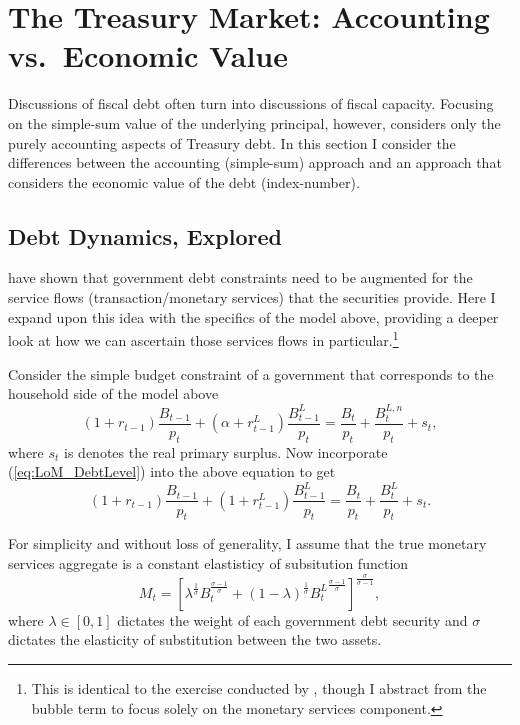 \documentclass[11pt,a4paper,margin=1.5in]{article}
\begin{document}


\section{The Treasury Market: Accounting vs.\ Economic Value}
\label{sec:FiscalCapacity}
Discussions of fiscal debt often turn into discussions of fiscal capacity.
Focusing on the simple-sum value of the underlying principal, however, considers only the purely accounting aspects of Treasury debt.
In this section I consider the differences between the accounting (simple-sum) approach and an approach that considers the economic value of the debt (index-number).

\subsection{Debt Dynamics, Explored}
\label{subsec:Theory_Capacity}
\citet*{Brunnermeier-Merkel-Sannikov:2022} have shown that government debt constraints need to be augmented for the service flows (transaction/monetary services) that the securities provide.
Here I expand upon this idea with the specifics of the model above, providing a deeper look at how we can ascertain those services flows in particular.\footnote{
	This is identical to the exercise conducted by \citet{Brunnermeier-Merkel-Sannikov:2020}, though I abstract from the bubble term to focus solely on the monetary services component.}

	Consider the simple budget constraint of a government that corresponds to the household side of the model above
\begin{equation*}
	(1+r_{t-1})\frac{B_{t-1}}{p_t} + (\alpha + r^L_{t-1})\frac{B^L_{t-1}}{p_t} = \frac{B_t}{p_t} + \frac{B^{L,n}_t}{p_t} + s_t,
\end{equation*}
where $s_t$ is denotes the real primary surplus. 
Now incorporate (\ref{eq:LoM_DebtLevel}) into the above equation to get
\begin{equation}
	(1+r_{t-1})\frac{B_{t-1}}{p_t} + (1 + r^L_{t-1})\frac{B^L_{t-1}}{p_t} = \frac{B_t}{p_t} + \frac{B^{L}_t}{p_t} + s_t.
	\label{eq:Gov_PeriodBudget}
\end{equation}

For simplicity and without loss of generality, I assume that the true monetary services aggregate is a constant elastisticy of subsitution function
\begin{equation}
	M_t = \left[\lambda^{\frac{1}{\sigma}}B_t^{\frac{\sigma-1}{\sigma}} + (1-\lambda)^{\frac{1}{\sigma}}{B^L_t}^{\frac{\sigma-1}{\sigma}}\right]^{\frac{\sigma}{\sigma-1}},
	\label{eq:MS_CES}
\end{equation}
where $\lambda \in [0,1]$ dictates the weight of each government debt security and $\sigma$ dictates the elasticity of substitution between the two assets.
\end{document}
